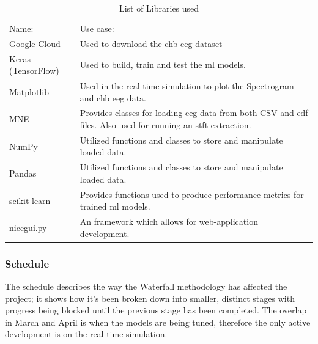 \documentclass[12pt]{article}
\begin{document}
\begin{table}[H]
\centering
\begin{tabular}{p{}p{}}
Name:              & Use case:                                                                                                                               \\
Google Cloud       & Used to download the \acrshort{chb} \acrshort{eeg} dataset                                                                            \\
Keras (TensorFlow) & Used to build, train and test the \acrshort{ml} models.                                                                \\
Matplotlib         & Used in the real-time simulation to plot the Spectrogram and \acrshort{chb} \acrshort{eeg} data.                                       \\
MNE                & Provides classes for loading \acrshort{eeg} data from both CSV and \acrshort{edf} files. Also used for running an \acrfull{stft} extraction. \\
NumPy              & Utilized functions and classes to store and manipulate loaded data.                                                                     \\
Pandas             & Utilized functions and classes to store and manipulate loaded data.                                                                     \\
scikit-learn       & Provides functions used to produce performance metrics for trained \acrshort{ml} models.                       \\
nicegui.py		& An framework which allows for web-application development.       
\end{tabular}
\caption{List of Libraries used}
\label{tab:libraries}
\end{table}


\subsubsection{Schedule}\label{schedule}

The schedule describes the way the Waterfall methodology has affected the project; it shows how it's been broken down into smaller, distinct stages with progress being blocked until the previous stage has been completed. The overlap in March and April is when the models are being tuned, therefore the only active development is on the real-time simulation. 
\end{document}
